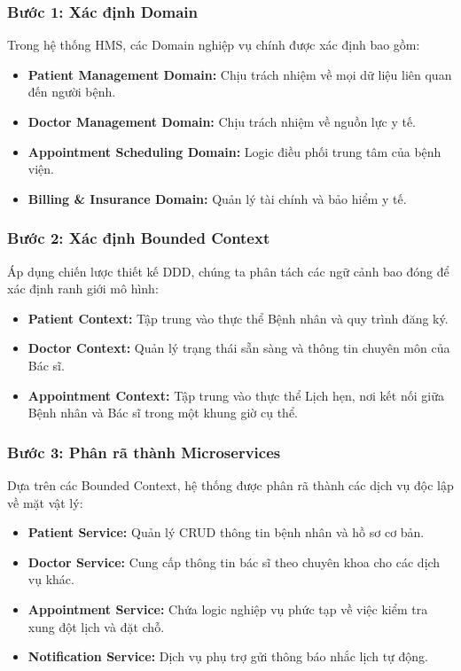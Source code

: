 \documentclass[12pt,a4paper]{report}
\begin{document}
\subsubsection{Bước 1: Xác định Domain}
Trong hệ thống HMS, các Domain nghiệp vụ chính được xác định bao gồm:
\begin{itemize}
    \item \textbf{Patient Management Domain:} Chịu trách nhiệm về mọi dữ liệu liên quan đến người bệnh.
    \item \textbf{Doctor Management Domain:} Chịu trách nhiệm về nguồn lực y tế.
    \item \textbf{Appointment Scheduling Domain:} Logic điều phối trung tâm của bệnh viện.
    \item \textbf{Billing \& Insurance Domain:} Quản lý tài chính và bảo hiểm y tế.
\end{itemize}

\subsubsection{Bước 2: Xác định Bounded Context}
Áp dụng chiến lược thiết kế DDD, chúng ta phân tách các ngữ cảnh bao đóng để xác định ranh giới mô hình:
\begin{itemize}
    \item \textbf{Patient Context:} Tập trung vào thực thể Bệnh nhân và quy trình đăng ký.
    \item \textbf{Doctor Context:} Quản lý trạng thái sẵn sàng và thông tin chuyên môn của Bác sĩ.
    \item \textbf{Appointment Context:} Tập trung vào thực thể Lịch hẹn, nơi kết nối giữa Bệnh nhân và Bác sĩ trong một khung giờ cụ thể.
\end{itemize}

\subsubsection{Bước 3: Phân rã thành Microservices}
Dựa trên các Bounded Context, hệ thống được phân rã thành các dịch vụ độc lập về mặt vật lý:
\begin{itemize}
    \item \textbf{Patient Service:} Quản lý CRUD thông tin bệnh nhân và hồ sơ cơ bản.
    \item \textbf{Doctor Service:} Cung cấp thông tin bác sĩ theo chuyên khoa cho các dịch vụ khác.
    \item \textbf{Appointment Service:} Chứa logic nghiệp vụ phức tạp về việc kiểm tra xung đột lịch và đặt chỗ.
    \item \textbf{Notification Service:} Dịch vụ phụ trợ gửi thông báo nhắc lịch tự động.
\end{itemize}
\end{document}
